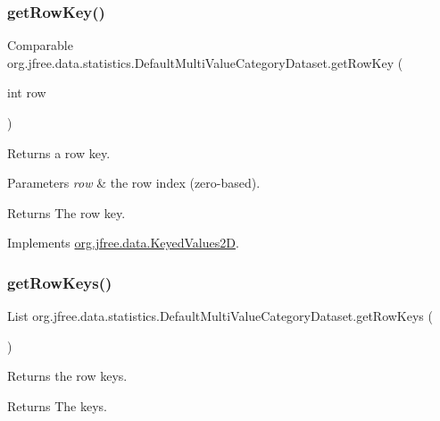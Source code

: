 \subsubsection{\texorpdfstring{get\+Row\+Key()}{getRowKey()}}
{\footnotesize\ttfamily Comparable org.\+jfree.\+data.\+statistics.\+Default\+Multi\+Value\+Category\+Dataset.\+get\+Row\+Key (\begin{DoxyParamCaption}\item[{int}]{row }\end{DoxyParamCaption})}

Returns a row key.


\begin{DoxyParams}{Parameters}
{\em row} & the row index (zero-\/based).\\
\hline
\end{DoxyParams}
\begin{DoxyReturn}{Returns}
The row key. 
\end{DoxyReturn}


Implements \mbox{\hyperlink{interfaceorg_1_1jfree_1_1data_1_1_keyed_values2_d_a7c145e2383036a479460e4bca7b40a95}{org.\+jfree.\+data.\+Keyed\+Values2D}}.

\mbox{\label{classorg_1_1jfree_1_1data_1_1statistics_1_1_default_multi_value_category_dataset_ae75c8347b1a96730dab876b0d0daede9}} 
\subsubsection{\texorpdfstring{get\+Row\+Keys()}{getRowKeys()}}
{\footnotesize\ttfamily List org.\+jfree.\+data.\+statistics.\+Default\+Multi\+Value\+Category\+Dataset.\+get\+Row\+Keys (\begin{DoxyParamCaption}{ }\end{DoxyParamCaption})}

Returns the row keys.

\begin{DoxyReturn}{Returns}
The keys. 
\end{DoxyReturn}


